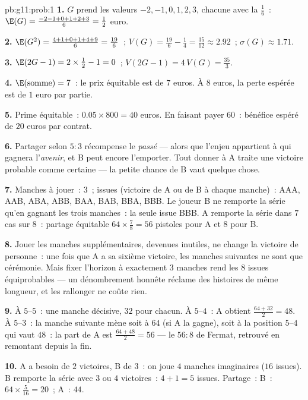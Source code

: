 \begin{solution}{pb:g11:prob:1}
\textbf{1.} $G$ prend les valeurs $-2, -1, 0, 1, 2, 3$, chacune
avec la  $\frac16$~: $\E(G) = \frac{-2 - 1 + 0 + 1 + 2 +
3}{6} = \frac12$ euro.

\textbf{2.} $\E(G^2) = \frac{4 + 1 + 0 + 1 + 4 + 9}{6} =
\frac{19}{6}$~; $V(G) = \frac{19}{6} - \frac14 = \frac{35}{12}
\approx 2.92$~; $\sigma(G) \approx 1.71$.

\textbf{3.} $\E(2G - 1) = 2 \times \frac12 - 1 = 0$~;
$V(2G - 1) = 4\,V(G) = \frac{35}{3}$.

\textbf{4.} $\E(\text{somme}) = 7$~: le prix équitable est de $7$
euros. À $8$ euros, la perte espérée est de $1$ euro par partie.

\textbf{5.} Prime équitable~: $0.05 \times 800 = 40$ euros. En
faisant payer $60$~: bénéfice espéré de $20$ euros par contrat.

\textbf{6.} Partager selon $5:3$ récompense le \emph{passé} ---
alors que l'enjeu appartient à qui gagnera l'\emph{avenir}, et B
peut encore l'emporter. Tout donner à A traite une victoire
probable comme certaine --- la petite chance de B vaut quelque
chose.

\textbf{7.} Manches à jouer~: $3$~; issues (victoire de A ou de B à
chaque manche)~: AAA, AAB, ABA, ABB, BAA, BAB, BBA, BBB. Le joueur
B ne remporte la série qu'en gagnant les trois manches~: la seule
issue BBB. A remporte la série dans $7$ cas sur $8$~: partage
équitable $64 \times \frac78 = 56$ pistoles pour A et $8$ pour B.

\textbf{8.} Jouer les manches supplémentaires, devenues inutiles, ne
change la victoire de personne~: une fois que A a sa sixième
victoire, les manches suivantes ne sont que cérémonie. Mais fixer
l'horizon à exactement $3$ manches rend les $8$ issues
équiprobables --- un dénombrement honnête réclame des histoires de
même longueur, et les rallonger ne coûte rien.

\textbf{9.} À $5$--$5$~: une manche décisive, $32$ pour chacun. À
$5$--$4$~: A obtient $\frac{64 + 32}{2} = 48$. À $5$--$3$~: la
manche suivante mène soit à $64$ (si A la gagne), soit à la
position $5$--$4$ qui vaut $48$~: la part de A est
$\frac{64 + 48}{2} = 56$ --- le $56 : 8$ de Fermat, retrouvé en
remontant depuis la fin.

\textbf{10.} A a besoin de $2$ victoires, B de $3$~: on joue $4$
manches imaginaires ($16$ issues). B remporte la série avec $3$ ou
$4$ victoires~: $4 + 1 = 5$ issues. Partage~:
B~: $64 \times \frac{5}{16} = 20$~; A~: $44$.


\end{solution}

